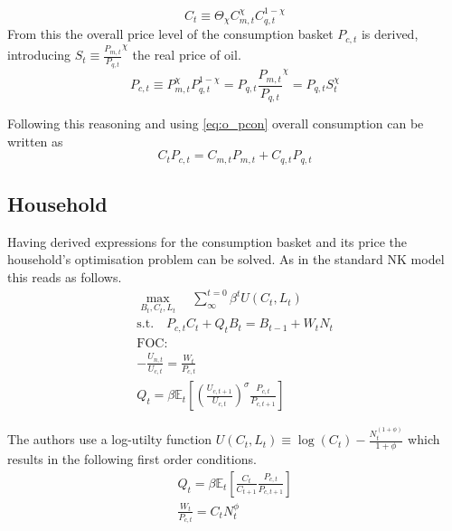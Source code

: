 \documentclass[12pt,a4paper,english]{article} %
\newcommand{\E}{\mathbb{E}} %
\begin{document}
	\begin{equation}
		C_t \equiv \Theta_\chi C_{m,t}^\chi C_{q,t}^{1-\chi}
	\end{equation}
	From this the overall price level of the consumption basket $P_{c,t}$ is derived, introducing $S_t \equiv \frac{P_{m,t}}{P_{q,t}}^\chi$ the real price of oil.
	\begin{equation}
		P_{c,t} \equiv P_{m,t}^\chi P_{q,t}^{1-\chi} 
			= P_{q,t} \frac{P_{m,t}}{P_{q,t}}^\chi
			= P_{q,t} S_t^\chi
	\end{equation}
		
	Following this reasoning and using \eqref{eq:o_pcon} overall consumption can be written as 
	\begin{equation}
		C_t P_{c,t} = C_{m,t}P_{m,t} + C_{q,t}P_{q,t}
	\end{equation}

	\subsection{Household}
	Having derived expressions for the consumption basket and its price the household's optimisation problem can be solved. As in the standard NK model this reads as follows. 
	\begin{equation}
		\begin{aligned}
			\max_{B_t, C_t, L_t} \quad \sum_{\infty}^{t=0} \beta^{t} U(C_{t}, L_{t}) \\
			\textrm{s.t.} \quad P_{c,t} C_t + Q_t B_t = B_{t-1} + W_t N_t \\
			\textrm{FOC:} \\
			- \frac{U_{n,t}}{U_{c, t}} = \frac{W_t}{P_{c,t}}\\
			Q_t = \beta \E_t \left[ \left( \frac{U_{c, t+1}}{U_{c,t}} \right)^\sigma \frac{P_{c,t}}{P_{c,t+1}} \right] 			
		\end{aligned}
	\end{equation}
	
	The authors use a log-utilty function $U(C_t,L_t) \equiv \log(C_t) - \frac{N_t^(1+\phi)}{1+\phi}$ which results in the following first order conditions.
	\begin{equation}
		\begin{aligned}
			Q_t = \beta \E_t \left[ \frac{C_t}{C_{t+1}} \frac{P_{c,t}}{P_{c,t+1}} \right] \\
			\frac{W_t}{P_{c,t}} = C_t N_t^\phi
		\end{aligned}
	\end{equation}
\end{document}
